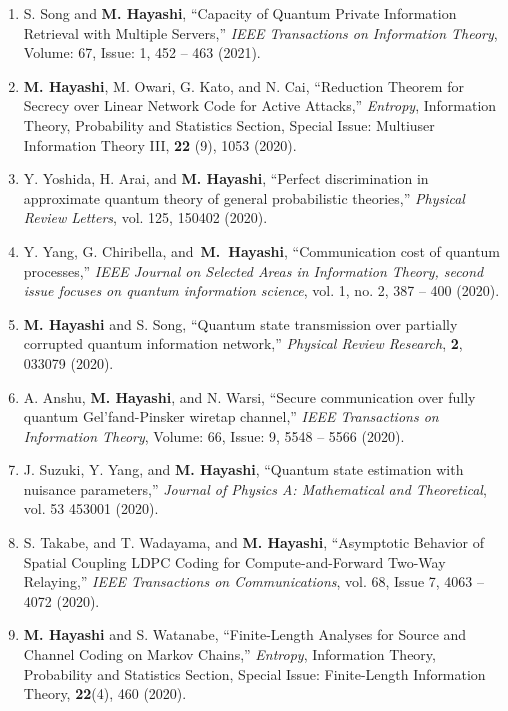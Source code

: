 \documentclass[a4paper,12pt,oneside]{article}
\begin{document}
\begin{enumerate}
\item  
S. Song and \textbf{M. Hayashi},
``Capacity of Quantum Private Information Retrieval with Multiple Servers,''
{\em IEEE Transactions on Information Theory}, 
Volume: 67, Issue: 1, 452 -- 463 (2021). 

\item  
\textbf{M. Hayashi}, M. Owari, G. Kato, and N. Cai,
``Reduction Theorem for Secrecy over Linear Network
Code for Active Attacks,''
{\em Entropy}, Information Theory, Probability and Statistics Section, Special Issue: Multiuser Information Theory III,  
{\bf 22} (9), 1053 (2020).

\item  
Y. Yoshida, H. Arai, and \textbf{M. Hayashi},
``Perfect discrimination in approximate quantum theory of general probabilistic theories,''
{\em Physical Review Letters}, 
vol. 125, 150402 (2020).

\item  
Y. Yang, G. Chiribella,  and~\textbf{M.~Hayashi},
``Communication cost of quantum processes,''
{\em IEEE Journal on Selected Areas in Information Theory, second issue focuses on quantum information science},
vol. 1, no. 2, 387 -- 400 (2020).
 
\item  
\textbf{M. Hayashi} and S. Song,
``Quantum state transmission over partially corrupted quantum information network,''
{\em Physical Review Research},  {\bf 2}, 033079 (2020).

\item  
A. Anshu, \textbf{M. Hayashi}, and N. Warsi,   
``Secure communication over fully quantum Gel'fand-Pinsker wiretap channel,''
{\em IEEE Transactions on Information Theory}, 
Volume: 66, Issue: 9, 5548 -- 5566 (2020). 

\item  
J. Suzuki, Y. Yang, and \textbf{M. Hayashi},
``Quantum state estimation with nuisance parameters,'' 
{\em Journal of Physics A: Mathematical and Theoretical}, 
vol. 53 453001 (2020). 

\item  
S. Takabe, and T. Wadayama, and \textbf{M. Hayashi}, 
``Asymptotic Behavior of Spatial Coupling LDPC Coding for Compute-and-Forward Two-Way Relaying,''
{\em IEEE Transactions on Communications},
vol. 68, Issue 7, 4063 -- 4072 (2020).

\item  
\textbf{M. Hayashi} and S. Watanabe,
``Finite-Length Analyses for Source and Channel Coding on Markov Chains,'' 
{\em Entropy}, Information Theory, Probability and Statistics Section, Special Issue: Finite-Length Information Theory,  
{\bf 22}(4), 460 (2020).


\end{enumerate}
\end{document}
